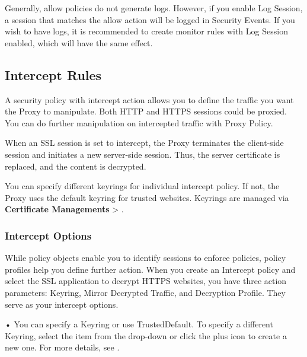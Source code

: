 Generally, allow policies do not generate logs. However, if you enable Log Session, a session that matches the allow action will be logged in Security Events. 
If you wish to have logs, it is recommended to create monitor rules with Log Session enabled, which will have the same effect.

\subsection*{\hypertarget{link:Intercept Rules}{Intercept Rules}}
\label{sec:policies:security:intercept}

A security policy with intercept action allows you to define the traffic you want the Proxy to manipulate. Both HTTP and HTTPS sessions could be proxied. 
You can do further manipulation on intercepted traffic with Proxy Policy. 


When an SSL session is set to intercept, the Proxy terminates the client-side session and initiates a new server-side session. 
Thus, the server certificate is replaced, and the content is decrypted. 


You can specify different keyrings for individual intercept policy. If not, the Proxy uses the default keyring for trusted websites. 
Keyrings are managed via \textbf{Certificate Managements} > \textbf{\hyperlink{link:Decryption Keyrings}{\color{linkblue}{Decryption Keyrings}}}.

\subsubsection*{\hypertarget{link:Intercept Options}{Intercept Options}}
\label{sec:policies:security:intercept:option}

While policy objects enable you to identify sessions to enforce policies, policy profiles help you define further action. 
When you create an Intercept policy and select the SSL application to decrypt HTTPS websites, you have three action parameters: 
Keyring, Mirror Decrypted Traffic, and Decryption Profile. They serve as your intercept options.

• You can specify a Keyring or use TrustedDefault. To specify a different Keyring, select the item from the drop-down or click the plus icon to create a new one. For more details, see \hyperlink{link:Decryption Keyrings}{\color{linkblue}{Decryption Keyrings}}. 


